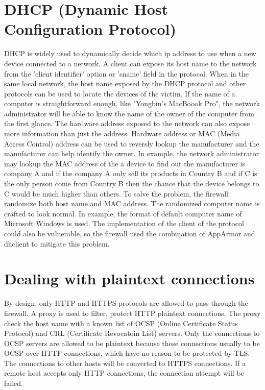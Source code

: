 \documentclass[mscthesis]{usiinfthesis}
\begin{document}
\section{DHCP (Dynamic Host Configuration Protocol)}

DHCP is widely used to dynamically decide which ip address to use when a new device connected to a network. A client can expose its host name to the network from the 'client identifier' option or 'sname' field in the protocol. When in the same local network, the host name exposed by the DHCP protocol and other protocols can be used to locate the devices of the victim. If the name of a computer is straightforward enough, like "Yongbin's MacBoook Pro", the network administrator will be able to know the name of the owner of the computer from the first glance. The hardware address exposed to the network can also expose more information than just the address. Hardware address or MAC (Media Access Control) address can be used to reversly lookup the manufacturer and the manufacturer can help identify the owner. In example, the network administrator may lookup the MAC address of the a device to find out the manufacturer is company A and if the company A only sell its products in Country B and if C is the only person come from Country B then the chance that the device belongs to C would be much higher than others. To solve the problem, the firewall randomize both host name and MAC address. The randomized computer name is crafted to look normal. In example, the format of default computer name of Microsoft Windows is used. The implementation of the client of the protocol could also be vulnerable, so the firewall used the combination of AppArmor and dhclient to mitigate this problem.

\section{Dealing with plaintext connections}

By design, only HTTP and HTTPS protocols are allowed to pass-through the firewall. A proxy is used to filter, protect HTTP plaintext connections. The proxy check the host name with a known list of OCSP (Online Certificate Status Protocol) and CRL (Certificate Revocatoin List) servers. Only the connections to OCSP servers are allowed to be plaintext because those connections usually to be OCSP over HTTP connections, which have no reason to be protected by TLS. The connections to other hosts will be converted to HTTPS connections. If a remote host accepts only HTTP connections, the connection attempt will be failed.
\end{document}
